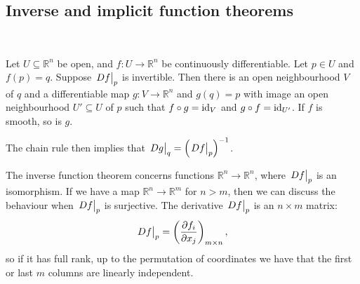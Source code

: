 \documentclass[a4paper,11pt]{article}
\begin{document}
\subsection{Inverse and implicit function theorems}
\ \vspace*{-1.5em}

\begin{theorem}
	Let \( U \subseteq \mathbb R^n \) be open, and \( f \colon U \to \mathbb R^n \) be continuously differentiable.
	Let \( p \in U \) and \( f(p) = q \).
	Suppose \( \eval{Df}_p \) is invertible.
	Then there is an open neighbourhood \( V \) of \( q \) and a differentiable map \( g \colon V \to \mathbb R^n \) and \( g(q) = p \) with image an open neighbourhood \( U' \subseteq U \) of \( p \) such that \( f \circ g = \operatorname{id}_V \) and $ g\circ f = \operatorname{id}_{U'} $.
	If \( f \) is smooth, so is $g$.
\end{theorem}
\begin{remark}
	The chain rule then implies that \( \eval{Dg}_q = \qty(\eval{Df}_p)^{-1} \).
\end{remark}

The inverse function theorem concerns functions \( \mathbb R^n \to \mathbb R^n \), where \( \eval{Df}_p \) is an isomorphism.
If we have a map \( \mathbb R^n \to \mathbb R^m \) for \( n > m \), then we can discuss the behaviour when \( \eval{Df}_p \) is surjective.
The derivative \( \eval{Df}_p \) is an \( n \times m \) matrix:
\[
	{\textstyle\eval{Df}_p} = \left( \pdv{f_i}{x_j} \right)_{m\times n},
\]
so if it has full rank, up to the permutation of coordinates we have that the first or last \( m \) columns are linearly independent.
\end{document}
